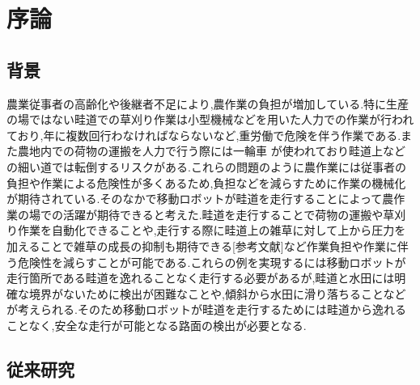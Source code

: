 \chapter{序論}
\section{背景}
農業従事者の高齢化や後継者不足により,農作業の負担が増加している.特に生産の場ではない畦道での草刈り作業は小型機械などを用いた人力での作業が行われており,年に複数回行わなければならないなど,重労働で危険を伴う作業である.また農地内での荷物の運搬を人力で行う際には一輪車%
が使われており畦道上などの細い道では転倒するリスクがある.これらの問題のように農作業には従事者の負担や作業による危険性が多くあるため,負担などを減らすために作業の機械化が期待されている.そのなかで移動ロボットが畦道を走行することによって農作業の場での活躍が期待できると考えた.畦道を走行することで荷物の運搬や草刈り作業を自動化できることや,走行する際に畦道上の雑草に対して上から圧力を加えることで雑草の成長の抑制も期待できる[参考文献]など作業負担や作業に伴う危険性を減らすことが可能である.これらの例を実現するには移動ロボットが走行箇所である畦道を逸れることなく走行する必要があるが,畦道と水田には明確な境界がないために検出が困難なことや,傾斜から水田に滑り落ちることなどが考えられる.そのため移動ロボットが畦道を走行するためには畦道から逸れることなく,安全な走行が可能となる路面の検出が必要となる.
\section{従来研究}


%
